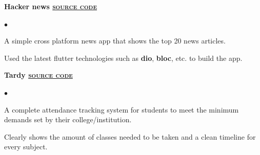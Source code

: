 \documentclass[10pt,a4paper]{extarticle}
\newcommand{\myProjectItem}[2]{%
	\item {%
	            \color{resumeBlueDark}%
	            \textbf{#1}}\\#2%
}%
\begin{document}
\begin{minipage}{0.55\textwidth}
\begin{list}{{\color{resumeBlueLight}}}{\leftmargin 1mm}
		\myProjectItem{Hacker news
		\hfill {\href{https://github.com/KunalRaghav/hacker_news}{\color{black}{\fontAwesomeBrands github} \textsc{source code}}}
		}{
			\vspace{-6mm}
			\begin{list}{\color{resumeBlueLight}$\bullet$}{\leftmargin 3mm}
				\item{A simple cross platform news app that shows the top 20 news articles.}
				\vspace{-1mm}
				\item{Used the latest flutter technologies such as \textbf{dio}, \textbf{bloc}, etc. to build the app.}
			\end{list}
			\vspace{-2mm}
        }
		\myProjectItem{Tardy
		\hfill {\href{https://github.com/KunalRaghav/Tardy/}{\color{black}{\fontAwesomeBrands github} \textsc{source code}}}
		}{
			\vspace{-6mm}
			\begin{list}{\color{resumeBlueLight}$\bullet$}{\leftmargin 3mm}
				\item{A complete attendance tracking system for students to meet the minimum demands set by their college/institution.}
				\vspace{-1mm}
				\item{Clearly shows the amount of classes needed to be taken and a clean timeline for every subject.}
			\end{list}
			\vspace{-2mm}
		}


\end{list}
\end{minipage}
\end{document}
